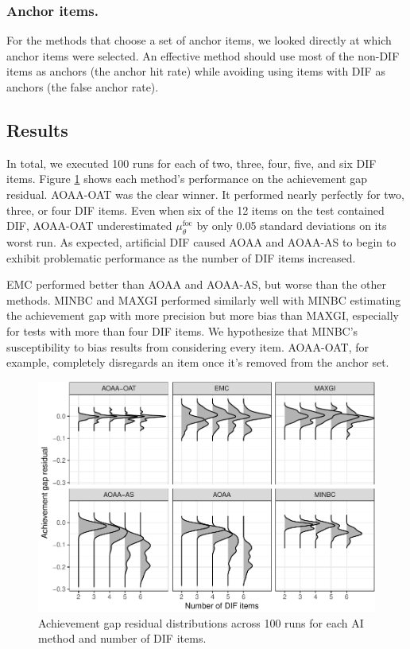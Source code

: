 \documentclass[
  11pt,
]{article}
\begin{document}
\hypertarget{anchor-items.}{%
\subsubsection{Anchor items.}\label{anchor-items.}}

For the methods that choose a set of anchor items, we looked directly at which anchor items were selected. An effective method should use most of the non-DIF items as anchors (the anchor hit rate) while avoiding using items with DIF as anchors (the false anchor rate).

\hypertarget{results}{%
\subsection{Results}\label{results}}

In total, we executed 100 runs for each of two, three, four, five, and six DIF items. Figure \ref{fig:achievegap} shows each method's performance on the achievement gap residual. AOAA-OAT was the clear winner. It performed nearly perfectly for two, three, or four DIF items. Even when six of the 12 items on the test contained DIF, AOAA-OAT underestimated \(\mu_\theta^\text{foc}\) by only 0.05 standard deviations on its worst run. As expected, artificial DIF caused AOAA and AOAA-AS to begin to exhibit problematic performance as the number of DIF items increased.

EMC performed better than AOAA and AOAA-AS, but worse than the other methods. MINBC and MAXGI performed similarly well with MINBC estimating the achievement gap with more precision but more bias than MAXGI, especially for tests with more than four DIF items. We hypothesize that MINBC's susceptibility to bias results from considering every item. AOAA-OAT, for example, completely disregards an item once it's removed from the anchor set.

\begin{figure}[H]

{\centering \includegraphics[width=0.7\linewidth]{paper_files/figure-latex/achievegap-1} 

}

\caption{Achievement gap residual distributions across 100 runs for each AI method and number of DIF items.}\label{fig:achievegap}
\end{figure}
\end{document}
